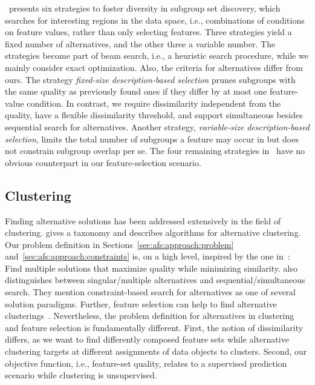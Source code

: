 \documentclass{article}
\theoremstyle{definition}
\begin{document}
\cite{leeuwen2012diverse}~presents six strategies to foster diversity in subgroup set discovery, which searches for interesting regions in the data space, i.e., combinations of conditions on feature values, rather than only selecting features.
Three strategies yield a fixed number of alternatives, and the other three a variable number.
The strategies become part of beam search, i.e., a heuristic search procedure, while we mainly consider exact optimization.
Also, the criteria for alternatives differ from ours.
The strategy \emph{fixed-size description-based selection} prunes subgroups with the same quality as previously found ones if they differ by at most one feature-value condition.
In contrast, we require dissimilarity independent from the quality, have a flexible dissimilarity threshold, and support simultaneous besides sequential search for alternatives.
Another strategy, \emph{variable-size description-based selection}, limits the total number of subgroups a feature may occur in but does not constrain subgroup overlap per se.
The four remaining strategies in~\cite{leeuwen2012diverse} have no obvious counterpart in our feature-selection scenario.

\subsection{Clustering}
\label{sec:afs:related-work:clustering}

Finding alternative solutions has been addressed extensively in the field of clustering.
\cite{bailey2014alternative} gives a taxonomy and describes algorithms for alternative clustering.
Our problem definition in Sections~\ref{sec:afs:approach:problem} and~\ref{sec:afs:approach:constraints} is, on a high level, inspired by the one in~\cite{bailey2014alternative}:
Find multiple solutions that maximize quality while minimizing similarity.
\cite{bailey2014alternative} also distinguishes between singular/multiple alternatives and sequential/simultaneous search.
They mention constraint-based search for alternatives as one of several solution paradigms.
Further, feature selection can help to find alternative clusterings~\cite{tao2012novel}.
Nevertheless, the problem definition for alternatives in clustering and feature selection is fundamentally different.
First, the notion of dissimilarity differs, as we want to find differently composed feature sets while alternative clustering targets at different assignments of data objects to clusters.
Second, our objective function, i.e., feature-set quality, relates to a supervised prediction scenario while clustering is unsupervised.
\end{document}
